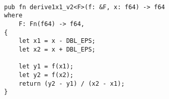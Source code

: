 \begin{lstlisting}[caption=Calculo de Derivada em Rust.]

pub fn derive1x1_v2<F>(f: &F, x: f64) -> f64
where
    F: Fn(f64) -> f64,
{
    let x1 = x - DBL_EPS;
    let x2 = x + DBL_EPS;

    let y1 = f(x1);
    let y2 = f(x2);
    return (y2 - y1) / (x2 - x1);
}


\end{lstlisting}
